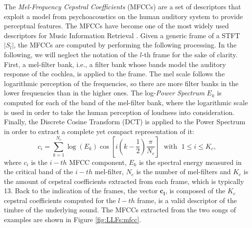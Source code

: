 The \textit{Mel-Frequency Cepstral Coefficients} (MFCCs) are a set of descriptors that exploit a model from psychoacoustics on the human auditory system to provide perceptual features. %
The MFCCs have become one of the most widely used descriptors for Music Information Retrieval \cite{muller2007information, muller2015fundamentals}.  Given a generic frame of a STFT $|S_l|$, the MFCCs are computed by performing the following processing. In the following, we will neglect the notation of the $l$-th frame for the sake of clarity. First, a mel-filter bank, i.e., a filter bank whose bands model the auditory response of the cochlea, is applied to the frame. The mel scale follows the logarithmic perception of the frequencies, so there are more filter banks in the lower frequencies than in the higher ones. The log-\textit{Power Spectrum} $E_k$ is computed for each of the band of the mel-filter bank, where the logarithmic scale is used in order to take the human perception of loudness into consideration. Finally, the Discrete Cosine Transform (DCT) is applied to the Power Spectrum in order to extract a complete yet compact representation of it:
\begin{equation}
c_i = \sum_{k=1}^{N_c}  \log(E_k) \cos \left[i \left(k-\frac{1}{2}\right) \frac{\pi}{N_c} \right]  \;\text{ with }\; 1\leq i\leq K_c, 
\end{equation}
where $c_i$ is the $i-th$ MFCC component, $E_k$ is the spectral energy measured in the critical band of the $i-th$ mel-filter, $N_c$ is the number of mel-filters and $K_c$ is the amount of cepstral coefficients extracted from each frame, which is typically 13. Back to the indication of the frames, the vector $\mathbf{c_l}$, is composed of the $K_c$ cepstral coefficients computed for the $l-th$ frame, is a valid descriptor of the timbre of the underlying sound. The MFCCs extracted from the two songs of examples are %
shown in Figure \ref{fig:LLFs:mfcc}. 


